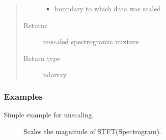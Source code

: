 \documentclass[letterpaper,10pt,english]{sphinxmanual}
\begin{document}
\begin{fulllineitems}
\begin{fulllineitems}
\begin{quote}
\begin{description}
\begin{itemize}
\item {} 
 \textendash{} boundary to which data was scaled.

\end{itemize}

\item[{Returns}] \leavevmode
unscaled spectrogramic mixture

\item[{Return type}] \leavevmode
ndarray

\end{description}\end{quote}
\subsubsection*{Examples}

Simple example for unscaling.

\begin{sphinxVerbatim}[commandchars=\\\{\}]
  \PYG{p}{[}\PYG{p}{[}    \PYG{p}{]} \PYG{p}{[}    \PYG{p}{]}\PYG{p}{]}
  
 \PYG{p}{[} \PYG{p}{]}
\PYG{g+go}{[[0.         0.68273064 0.851306   0.25795466 1.        ]}
\PYG{g+go}{ [0.         0.25795466 0.         0.         0.48812467]]}
\end{sphinxVerbatim}



\begin{description}
\item[{{\hyperref[\detokenize{docs/source/preprocess:preprocess.preprocess_tools.Scaler.scale}]{}}}] \leavevmode
Scales the magnitude of STFT(Spectrogram).

\end{description}



\end{fulllineitems}


\end{fulllineitems}
\end{document}
